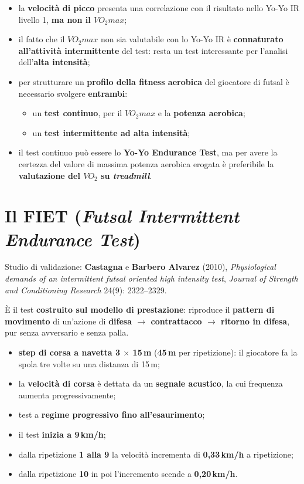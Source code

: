 \begin{itemize}
  \item la \textbf{velocità di picco} presenta una correlazione con il risultato nello Yo-Yo IR
    livello 1, \textbf{ma non il $VO_2max$};
  \item il fatto che il $VO_2max$ non sia valutabile con lo Yo-Yo IR è \textbf{connaturato
    all'attività intermittente} del test: resta un test interessante per l'analisi dell'\textbf{alta
    intensità};
  \item per strutturare un \textbf{profilo della fitness aerobica} del giocatore di futsal è
    necessario svolgere \textbf{entrambi}:
    \begin{itemize}
      \item un \textbf{test continuo}, per il $VO_2max$ e la \textbf{potenza aerobica};
      \item un \textbf{test intermittente ad alta intensità};
    \end{itemize}
  \item il test continuo può essere lo \textbf{Yo-Yo Endurance Test}, ma per avere la certezza del
    valore di massima potenza aerobica erogata è preferibile la \textbf{valutazione del $VO_2$ su
    \textit{treadmill}}.
\end{itemize}

\section{Il FIET (\texorpdfstring{\textit{Futsal Intermittent Endurance Test}}{Futsal Intermittent Endurance Test})}
\label{sec:fiet}

Studio di validazione: \textbf{Castagna} e \textbf{Barbero Alvarez} (2010), \textit{Physiological
demands of an intermittent futsal oriented high intensity test}, \textit{Journal of Strength and
Conditioning Research} 24(9): 2322--2329.

È il test \textbf{costruito sul modello di prestazione}: riproduce il \textbf{pattern di movimento}
di un'azione di \textbf{difesa $\rightarrow$ contrattacco $\rightarrow$ ritorno in difesa}, pur
senza avversario e senza palla.

\begin{itemize}
  \item \textbf{step di corsa a navetta 3 $\times$ 15\,m} (\textbf{45\,m} per ripetizione): il
    giocatore fa la spola tre volte su una distanza di 15\,m;
  \item la \textbf{velocità di corsa} è dettata da un \textbf{segnale acustico}, la cui frequenza
    aumenta progressivamente;
  \item test a \textbf{regime progressivo fino all'esaurimento};
  \item il test \textbf{inizia a 9\,km/h};
  \item dalla ripetizione \textbf{1 alla 9} la velocità incrementa di \textbf{0,33\,km/h} a
    ripetizione;
  \item dalla ripetizione \textbf{10} in poi l'incremento scende a \textbf{0,20\,km/h}.
\end{itemize}

